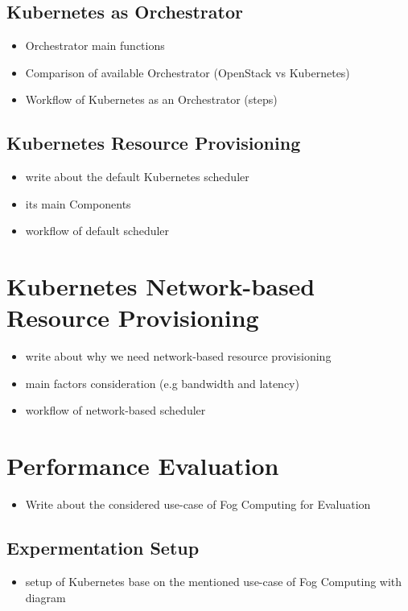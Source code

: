 \subsection{Kubernetes as Orchestrator}
\label{sec:k8s_orchestrator}
\begin{itemize}
  \item Orchestrator main functions
  \item Comparison of available Orchestrator (OpenStack vs Kubernetes)
  \item Workflow of Kubernetes as an Orchestrator (steps)
\end{itemize}

\subsection{Kubernetes Resource Provisioning}
\label{sec:k8s_scheduler}
\begin{itemize}
  \item write about the default Kubernetes scheduler
  \item its main Components
  \item workflow of default scheduler
\end{itemize}

\section{Kubernetes Network-based Resource Provisioning}
\label{sec: k8s_ns}
\begin{itemize}
  \item write about why we need network-based resource provisioning
  \item main factors consideration (e.g bandwidth and latency)
  \item workflow of network-based scheduler
\end{itemize}

\section{Performance Evaluation}
\label{sec:Performance_eval}
\begin{itemize}
  \item Write about the considered use-case of Fog Computing for Evaluation
\end{itemize}
\subsection{Expermentation Setup}
\label{sec:setup}
\begin{itemize}
  \item setup of Kubernetes base on the mentioned use-case of Fog Computing with diagram
\end{itemize}

